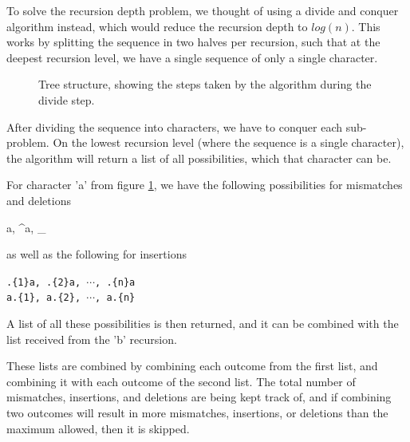 \documentclass[12pt]{article}
\theoremstyle{definition}
\newcounter{subsubsubsection}[subsubsection]
\begin{document}

To solve the recursion depth problem, we thought of using a divide and conquer algorithm instead, which would reduce the recursion depth to $log(n)$. This works by splitting the sequence in two halves per recursion, such that at the deepest recursion level, we have a single sequence of only a single character. 

\begin{figure}[H]
	\centering
	\caption{Tree structure, showing the steps taken by the algorithm during the divide step.}
	\label{fig:tree_example}
\end{figure}

After dividing the sequence into characters, we have to conquer each sub-problem. On the lowest recursion level (where the sequence is a single character), the algorithm will return a list of all possibilities, which that character can be.

For character 'a' from figure \ref{fig:tree_example}, we have the following possibilities for mismatches and deletions

\begin{center}
	{a, \^{}a, \_}
\end{center}

as well as the following for insertions

\begin{center}
	\texttt{.\{1\}a, .\{2\}a, $\cdots$, .\{n\}a} \\
	\texttt{a.\{1\}, a.\{2\}, $\cdots$, a.\{n\}}
\end{center}

A list of all these possibilities is then returned, and it can be combined with the list received from the 'b' recursion.

These lists are combined by combining each outcome from the first list, and combining it with each outcome of the second list. The total number of mismatches, insertions, and deletions are being kept track of, and if combining two outcomes will result in more mismatches, insertions, or deletions than the maximum allowed, then it is skipped.
\end{document}
